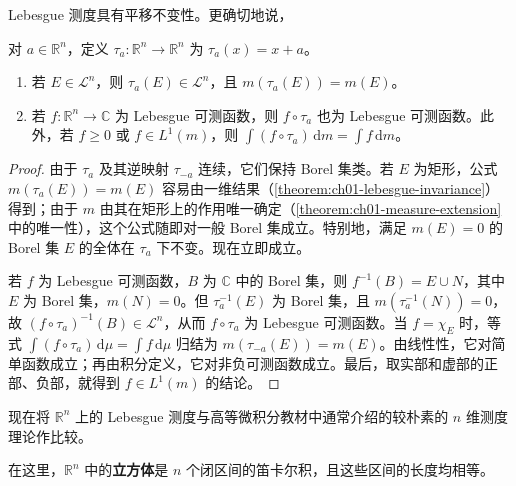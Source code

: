 \documentclass[../../main.tex]{subfiles}%
\begin{document}
\begin{theorem}\label{theorem:ch02-nd-translation}
Lebesgue 测度具有平移不变性。更确切地说，\begin{definition*}[平移映射]
对 $a\in\mathbb{R}^n$，定义 $\tau_a:\mathbb{R}^n\to\mathbb{R}^n$ 为 $\tau_a(x)=x+a$。
\end{definition*}
\begin{enumerate}
\item\label{item:ch02-nd-translation-sets} 若 $E\in\mathscr{L}^n$，则 $\tau_a(E)\in\mathscr{L}^n$，且 $m(\tau_a(E))=m(E)$。
\item\label{item:ch02-nd-translation-functions} 若 $f:\mathbb{R}^n\to\mathbb{C}$ 为 Lebesgue 可测函数，则 $f\circ\tau_a$ 也为 Lebesgue 可测函数。此外，若 $f\ge0$ 或 $f\in L^1(m)$，则 $\int(f\circ\tau_a)\,\mathrm{d}m=\int f\,\mathrm{d}m$。
\end{enumerate}
\end{theorem}
\begin{proof}
由于 $\tau_a$ 及其逆映射 $\tau_{-a}$ 连续，它们保持 Borel 集类。若 $E$ 为矩形，公式 $m(\tau_a(E))=m(E)$ 容易由一维结果（\cref{theorem:ch01-lebesgue-invariance}）得到；由于 $m$ 由其在矩形上的作用唯一确定（\cref{theorem:ch01-measure-extension}中的唯一性），这个公式随即对一般 Borel 集成立。特别地，满足 $m(E)=0$ 的 Borel 集 $E$ 的全体在 $\tau_a$ 下不变。现在立即成立。

若 $f$ 为 Lebesgue 可测函数，$B$ 为 $\mathbb{C}$ 中的 Borel 集，则 $f^{-1}(B)=E\cup N$，其中 $E$ 为 Borel 集，$m(N)=0$。但 $\tau_a^{-1}(E)$ 为 Borel 集，且 $m(\tau_a^{-1}(N))=0$，故 $(f\circ\tau_a)^{-1}(B)\in\mathscr{L}^n$，从而 $f\circ\tau_a$ 为 Lebesgue 可测函数。当 $f=\chi_E$ 时，等式 $\int(f\circ\tau_a)\,\mathrm{d}\mu=\int f\,\mathrm{d}\mu$ 归结为 $m(\tau_{-a}(E))=m(E)$。由线性性，它对简单函数成立；再由积分定义，它对非负可测函数成立。最后，取实部和虚部的正部、负部，就得到 $f\in L^1(m)$ 的结论。
\end{proof}
现在将 $\mathbb{R}^n$ 上的 Lebesgue 测度与高等微积分教材中通常介绍的较朴素的 $n$ 维测度理论作比较。
\begin{definition}[立方体]\label{definition:ch02-cube}
在这里，$\mathbb{R}^n$ 中的\textbf{立方体}是 $n$ 个闭区间的笛卡尔积，且这些区间的长度均相等。
\end{definition}
\end{document}
